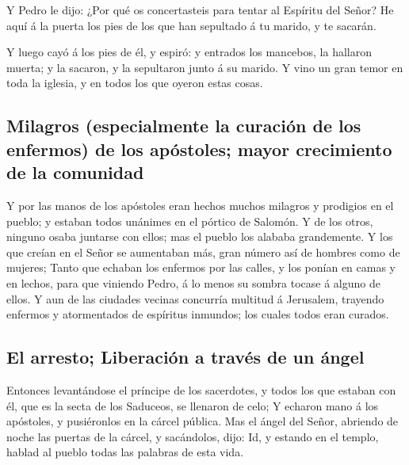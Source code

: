  Y Pedro le dijo: ¿Por qué os concertasteis para tentar al
Espíritu del Señor? He aquí á la puerta los pies de los que han
sepultado á tu marido, y te sacarán.

 Y luego cayó á los pies de él, y espiró: y entrados los
mancebos, la hallaron muerta; y la sacaron, y la sepultaron junto á su
marido.  Y vino un gran temor en toda la iglesia, y en
todos los que oyeron estas cosas.

\hypertarget{milagros-especialmente-la-curaciuxf3n-de-los-enfermos-de-los-apuxf3stoles-mayor-crecimiento-de-la-comunidad}{%
\subsection{Milagros (especialmente la curación de los enfermos) de los
apóstoles; mayor crecimiento de la
comunidad}\label{milagros-especialmente-la-curaciuxf3n-de-los-enfermos-de-los-apuxf3stoles-mayor-crecimiento-de-la-comunidad}}

 Y por las manos de los apóstoles eran hechos muchos
milagros y prodigios en el pueblo; y estaban todos unánimes en el
pórtico de Salomón.  Y de los otros, ninguno osaba
juntarse con ellos; mas el pueblo los alababa grandemente.
 Y los que creían en el Señor se aumentaban más, gran
número así de hombres como de mujeres;  Tanto que echaban
los enfermos por las calles, y los ponían en camas y en lechos, para que
viniendo Pedro, á lo menos su sombra tocase á alguno de ellos.
 Y aun de las ciudades vecinas concurría multitud á
Jerusalem, trayendo enfermos y atormentados de espíritus inmundos; los
cuales todos eran curados.

\hypertarget{el-arresto-liberaciuxf3n-a-travuxe9s-de-un-uxe1ngel}{%
\subsection{El arresto; Liberación a través de un
ángel}\label{el-arresto-liberaciuxf3n-a-travuxe9s-de-un-uxe1ngel}}

 Entonces levantándose el príncipe de los sacerdotes, y
todos los que estaban con él, que es la secta de los Saduceos, se
llenaron de celo;  Y echaron mano á los apóstoles, y
pusiéronlos en la cárcel pública.  Mas el ángel del
Señor, abriendo de noche las puertas de la cárcel, y sacándolos, dijo:
 Id, y estando en el templo, hablad al pueblo todas las
palabras de esta vida.

